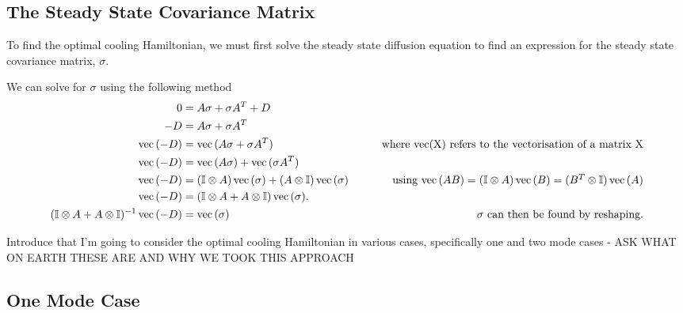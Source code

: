 \documentclass[11pt,a4paper]{article}
\numberwithin{equation}{section}
\DeclareMathOperator{\Vect}{vec}
\begin{document}
	\subsection{The Steady State Covariance Matrix}
	\label{sec:sigmasolve}
	
	To find the optimal cooling Hamiltonian, we must first solve the steady state diffusion equation to find an expression for the steady state covariance matrix, $\sigma$. 
	
	We can solve for $\sigma$ using the following method
	\begin{align*}
	0 &= A\sigma +\sigma A^{T} + D&\\
	-D &= A\sigma +\sigma A^{T}&\\
	\Vect{(-D)} &= \Vect{(A\sigma +\sigma A^{T})}& \tag*{\text{where vec(X) refers to the vectorisation of a matrix X}}\\
	\Vect{(-D)} &= \Vect{(A\sigma)} + \Vect{(\sigma A^{T})}&\\
	\Vect{(-D)} &= (\mathbb{I} \otimes A)\Vect{(\sigma)} + (A \otimes \mathbb{I})\Vect{(\sigma)} & \tag*{\text{using $\Vect{(AB)}=(\mathbb{I} \otimes A)\Vect{(B)}=(B^{T} \otimes \mathbb{I})\Vect{(A)} $}}\\
	\Vect{(-D)} &= (\mathbb{I} \otimes A + A \otimes \mathbb{I}) \Vect{(\sigma)}.&\\
	(\mathbb{I} \otimes A + A \otimes \mathbb{I})^{-1}\Vect{(-D)} &= \Vect{(\sigma)}& \tag*{$\sigma$ can then be found by reshaping.}
	\end{align*}
	 
	\color{blue}Introduce that I'm going to consider the optimal cooling Hamiltonian in various cases, specifically one and two mode cases - ASK WHAT ON EARTH THESE ARE AND WHY WE TOOK THIS APPROACH \color{black}	
	
	\subsection{One Mode Case}
	\label{sec:onemode}
\end{document}
